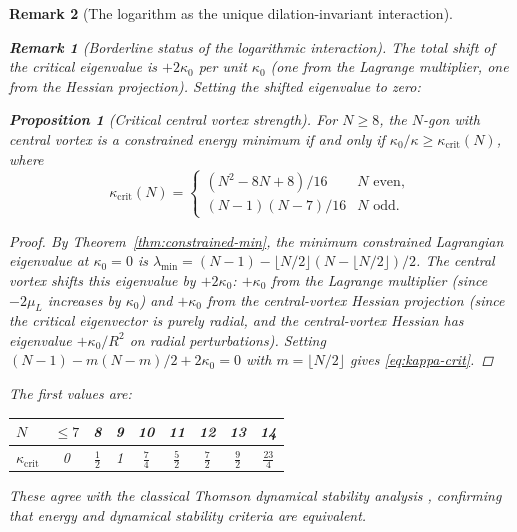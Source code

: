 \documentclass[12pt, a4paper]{article}
\newtheorem{proposition}[theorem]{Proposition}
\newtheorem{remark}{Remark}[section]
\numberwithin{equation}{section}
\begin{document}
\begin{remark}[The logarithm as the unique dilation-invariant interaction]
\begin{remark}[Borderline status of the logarithmic interaction]
The total shift of the critical eigenvalue is $+2\kappa_0$ per unit
$\kappa_0$ (one from the Lagrange multiplier, one from the Hessian
projection).  Setting the shifted eigenvalue to zero:

\begin{proposition}[Critical central vortex strength]
\label{prop:kappa-crit}
For $N \ge 8$, the $N$-gon with central vortex is a constrained energy
minimum if and only if $\kappa_0/\kappa \ge \kappa_{\mathrm{crit}}(N)$,
where
\begin{equation}\label{eq:kappa-crit}
  \kappa_{\mathrm{crit}}(N) = \begin{cases}
    (N^2 - 8N + 8)/16 & N \text{ even}, \\[3pt]
    (N{-}1)(N{-}7)/16 & N \text{ odd}.
  \end{cases}
\end{equation}
\end{proposition}

\begin{proof}
By Theorem~\ref{thm:constrained-min}, the minimum constrained
Lagrangian eigenvalue at $\kappa_0 = 0$ is
$\lambda_{\min} = (N{-}1) - \lfloor N/2\rfloor(N - \lfloor N/2\rfloor)/2$.
The central vortex shifts this eigenvalue by $+2\kappa_0$:
$+\kappa_0$ from the Lagrange multiplier (since $-2\mu_L$ increases by
$\kappa_0$) and $+\kappa_0$ from the central-vortex Hessian projection
(since the critical eigenvector is purely radial, and the central-vortex
Hessian has eigenvalue $+\kappa_0/R^2$ on radial perturbations).
Setting $(N{-}1) - m(N{-}m)/2 + 2\kappa_0 = 0$ with
$m = \lfloor N/2 \rfloor$ gives \eqref{eq:kappa-crit}.
\end{proof}

\noindent
The first values are:

\begin{center}
\begin{tabular}{lcccccccc}
\toprule
$N$ & $\le 7$ & 8 & 9 & 10 & 11 & 12 & 13 & 14 \\
\midrule
$\kappa_{\mathrm{crit}}$ & 0 & $\frac12$ & 1 &
  $\frac74$ & $\frac52$ & $\frac72$ & $\frac92$ & $\frac{23}{4}$ \\
\bottomrule
\end{tabular}
\end{center}

\noindent
These agree with the classical Thomson dynamical stability analysis
\citep{Thomson1883, Havelock1931}, confirming that energy and dynamical
stability criteria are equivalent.


\end{remark}
\end{remark}
\end{document}
